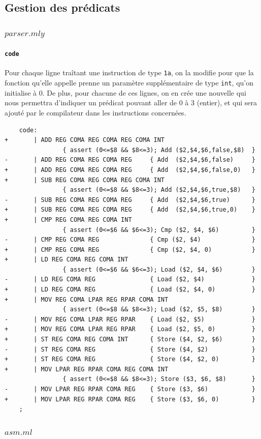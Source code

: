 \documentclass[11pt, a4paper, twoside, titlepage]{article}
\begin{document}
\subsection{Gestion des prédicats}

\subsubsection{$parser.mly$}
\paragraph{\texttt{code}}
Pour chaque ligne traîtant une instruction de type \texttt{1a}, on la modifie pour que la fonction qu'elle appelle prenne un paramètre supplémentaire de type \texttt{int}, qu'on initialise à 0. De plus, pour chacune de ces lignes, on en crée une nouvelle qui nous permettra d'indiquer un prédicat pouvant aller de 0 à 3 (entier), et qui sera ajouté par le compilateur dans les instructions concernées.
\begin{lstlisting}
	code:
+		| ADD REG COMA REG COMA REG COMA INT
				{ assert (0<=$8 && $8<=3); Add ($2,$4,$6,false,$8)	}
-		| ADD REG COMA REG COMA REG		{ Add  ($2,$4,$6,false)		}
+		| ADD REG COMA REG COMA REG		{ Add  ($2,$4,$6,false,0)	}
+		| SUB REG COMA REG COMA REG COMA INT
				{ assert (0<=$8 && $8<=3); Add ($2,$4,$6,true,$8)	}
-		| SUB REG COMA REG COMA REG		{ Add  ($2,$4,$6,true)		}
+		| SUB REG COMA REG COMA REG		{ Add  ($2,$4,$6,true,0)	}
+		| CMP REG COMA REG COMA INT
				{ assert (0<=$6 && $6<=3); Cmp ($2, $4, $6)			}
-		| CMP REG COMA REG				{ Cmp ($2, $4)				}
+		| CMP REG COMA REG				{ Cmp ($2, $4, 0)			}
+		| LD REG COMA REG COMA INT
				{ assert (0<=$6 && $6<=3); Load ($2, $4, $6)		}
-		| LD REG COMA REG				{ Load ($2, $4)				}
+		| LD REG COMA REG				{ Load ($2, $4, 0)			}
+		| MOV REG COMA LPAR REG RPAR COMA INT
				{ assert (0<=$8 && $8<=3); Load ($2, $5, $8)		}
-		| MOV REG COMA LPAR REG RPAR	{ Load ($2, $5)				}
+		| MOV REG COMA LPAR REG RPAR	{ Load ($2, $5, 0)			}
+		| ST REG COMA REG COMA INT		{ Store ($4, $2, $6)		}
-		| ST REG COMA REG				{ Store ($4, $2)			}
+		| ST REG COMA REG				{ Store ($4, $2, 0)			}
+		| MOV LPAR REG RPAR COMA REG COMA INT
				{ assert (0<=$8 && $8<=3); Store ($3, $6, $8)		}
-		| MOV LPAR REG RPAR COMA REG	{ Store ($3, $6)			}
+		| MOV LPAR REG RPAR COMA REG	{ Store ($3, $6, 0)			}
	;
\end{lstlisting}

\subsubsection{$asm.ml$}
\end{document}
